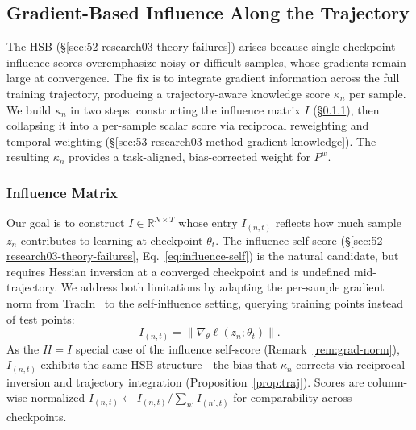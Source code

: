 \subsection{Gradient-Based Influence Along the Trajectory} \label{sec:53-research03-method-gradient}
\begin{foldable} %
  The \acl{HSB} (\S\ref{sec:52-research03-theory-failures}) arises because single-checkpoint influence scores overemphasize noisy or difficult samples, whose gradients remain large at convergence.
  The fix is to integrate gradient information across the full training trajectory, producing a trajectory-aware knowledge score $\kappa_n$ per sample.
  We build $\kappa_n$ in two steps: constructing the influence matrix $I$ (\S\ref{sec:53-research03-method-gradient-influence}), then collapsing it into a per-sample scalar score via reciprocal reweighting and temporal weighting (\S\ref{sec:53-research03-method-gradient-knowledge}).
  The resulting $\kappa_n$ provides a task-aligned, bias-corrected weight for $P^w$.
\end{foldable}

\subsubsection{Influence Matrix} \label{sec:53-research03-method-gradient-influence}
\begin{foldable} %
  Our goal is to construct $I \in \mathbb{R}^{N \times T}$ whose entry $I_{(n,t)}$ reflects how much sample $z_n$ contributes to learning at checkpoint $\theta_t$.
  The influence self-score (\S\ref{sec:52-research03-theory-failures}, Eq.~\ref{eq:influence-self}) is the natural candidate, but requires Hessian inversion at a converged checkpoint and is undefined mid-trajectory.
  We address both limitations by adapting the per-sample gradient norm from TracIn~\cite{pruthi2020estimating} to the self-influence setting, querying training points instead of test points:
  \begin{equation}
    I_{(n,t)} = \|\nabla_\theta \ell(z_n; \theta_t)\|.
    \label{eq:influence-matrix}
  \end{equation}
  As the $H=I$ special case of the influence self-score (Remark~\ref{rem:grad-norm}), $I_{(n,t)}$ exhibits the same \ac{HSB} structure---the bias that $\kappa_n$ corrects via reciprocal inversion and trajectory integration (Proposition~\ref{prop:traj}).
  Scores are column-wise normalized $I_{(n,t)} \leftarrow I_{(n,t)} / \sum_{n'} I_{(n',t)}$ for comparability across checkpoints.
\end{foldable}

